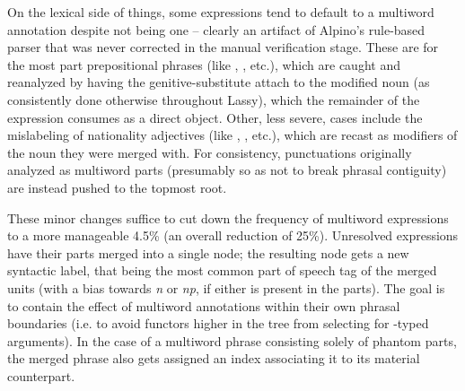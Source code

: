 On the lexical side of things, some expressions tend to default to a multiword annotation despite not being one -- clearly an artifact of Alpino's rule-based parser that was never corrected in the manual verification stage.
These are for the most part prepositional phrases (like , , etc.), which are caught and reanalyzed by having the genitive-substitute  attach to the modified noun (as consistently done otherwise throughout Lassy), which the remainder of the expression consumes as a direct object.
Other, less severe, cases include the mislabeling of nationality adjectives (like , , etc.), which are recast as modifiers of the noun they were merged with.
For consistency, punctuations originally analyzed as multiword parts (presumably so as not to break phrasal contiguity) are instead pushed to the topmost root.

These minor changes suffice to cut down the frequency of multiword expressions to a more manageable 4.5\% (an overall reduction of 25\%).
Unresolved expressions have their parts merged into a single node; the resulting node gets a new syntactic label, that being the most common part of speech tag of the merged units (with a bias towards \textit{n} or \textit{np}, if either is present in the parts).
The goal is to contain the effect of multiword annotations within their own phrasal boundaries (i.e. to avoid functors higher in the tree from selecting for -typed arguments).
In the case of a multiword phrase consisting solely of phantom parts, the merged phrase also gets assigned an index associating it to its material counterpart.

